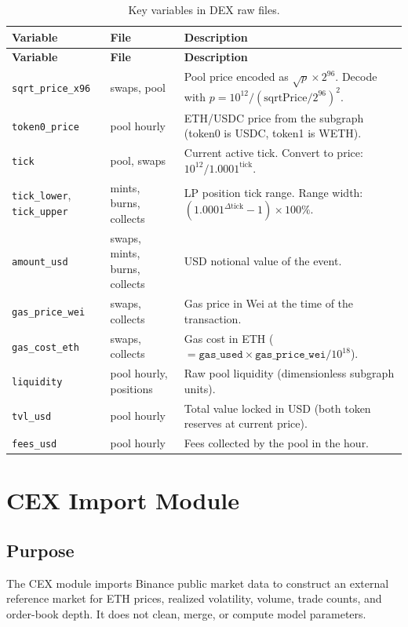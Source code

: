 \documentclass[11pt,a4paper]{article}
\begin{document}
\begin{longtable}{L{4.0cm}L{2.5cm}L{8.0cm}}
\caption{Key variables in DEX raw files.}\\
\toprule
\textbf{Variable} & \textbf{File} & \textbf{Description} \\
\midrule
\endfirsthead
\toprule
\textbf{Variable} & \textbf{File} & \textbf{Description} \\
\midrule
\endhead
\bottomrule
\endfoot
\texttt{sqrt\_price\_x96} & swaps, pool & Pool price encoded as $\sqrt{p} \times 2^{96}$. Decode with $p = 10^{12}/(\text{sqrtPrice}/2^{96})^2$. \\
\texttt{token0\_price} & pool hourly & ETH/USDC price from the subgraph (token0 is USDC, token1 is WETH). \\
\texttt{tick} & pool, swaps & Current active tick. Convert to price: $10^{12} / 1.0001^{\text{tick}}$. \\
\texttt{tick\_lower}, \texttt{tick\_upper} & mints, burns, collects & LP position tick range. Range width: $(1.0001^{\Delta\text{tick}}-1)\times 100\%$. \\
\texttt{amount\_usd} & swaps, mints, burns, collects & USD notional value of the event. \\
\texttt{gas\_price\_wei} & swaps, collects & Gas price in Wei at the time of the transaction. \\
\texttt{gas\_cost\_eth} & swaps, collects & Gas cost in ETH ($= \texttt{gas\_used} \times \texttt{gas\_price\_wei} / 10^{18}$). \\
\texttt{liquidity} & pool hourly, positions & Raw pool liquidity (dimensionless subgraph units). \\
\texttt{tvl\_usd} & pool hourly & Total value locked in USD (both token reserves at current price). \\
\texttt{fees\_usd} & pool hourly & Fees collected by the pool in the hour. \\
\end{longtable}

\section{CEX Import Module}

\subsection{Purpose}

The CEX module imports Binance public market data to construct an external reference market for ETH prices, realized volatility, volume, trade counts, and order-book depth. It does not clean, merge, or compute model parameters.
\end{document}
